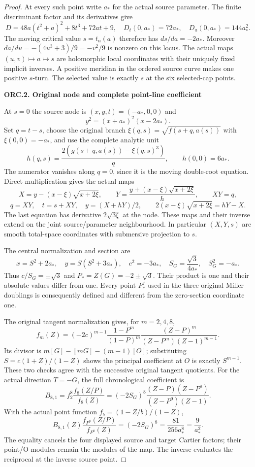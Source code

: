 \begin{proof}
At every such point write \(a_*\) for the actual source parameter.
The finite discriminant factor and its derivatives give
\[
D=48a(t^2+a)^2+8t^3+72at+9,\quad
D_t(0,a_*)=72a_*,\quad D_a(0,a_*)=144a_*^2 .
\tag{ORC.3}
\]
The moving critical value \(s=t_n(a)\) therefore has
\(ds/da=-2a_*\). Moreover \(da/du=-(4u^3+3)/9=-v^2/9\)
is nonzero on this locus. The actual maps
\((u,v)\mapsto a\mapsto s\) are holomorphic local coordinates
with their uniquely fixed implicit inverses. A positive meridian
in the ordered source curve makes one positive \(s\)-turn.
The selected value is exactly \(s\) at the six selected-cap points.

\par

\medskip\noindent\textbf{ORC.2. Original node and complete point-line coefficient}

\par\nobreak

At \(s=0\) the source node is \((x,y,t)=(-a_*,0,0)\) and
\[
y^2=(x+a_*)^2(x-2a_*).
\tag{ORC.4}
\]
Set \(q=t-s\), choose the original branch
\(\xi(q,s)=\sqrt{f(s+q,a(s))}\) with \(\xi(0,0)=-a_*\),
and use the complete analytic unit
\[
h(q,s)=\frac{2(g(s+q,a(s))-\xi(q,s)^3)}q,\qquad h(0,0)=6a_*.
\tag{ORC.5}
\]
The numerator vanishes along \(q=0\), since it is the moving
double-root equation. Direct multiplication gives the actual maps
\[
X=y-(x-\xi)\sqrt{x+2\xi},\qquad
Y=\frac{y+(x-\xi)\sqrt{x+2\xi}}h,\qquad XY=q,
\tag{ORC.6}
\]
\[
q=XY,\quad t=s+XY,\quad y=(X+hY)/2,\qquad
2(x-\xi)\sqrt{x+2\xi}=hY-X.
\tag{ORC.7}
\]
The last equation has derivative \(2\sqrt{3\xi}\) at the node.
These maps and their inverse extend on the joint source/parameter
neighbourhood. In particular \((X,Y,s)\) are smooth total-space
coordinates with submersive projection to \(s\).

The central normalization and section are
\[
x=S^2+2a_*,\quad y=S(S^2+3a_*),\quad
c^2=-3a_*,\quad S_G=\frac{\sqrt3}{4a_*},\quad S_G^2=-a_*.
\tag{ORC.8}
\]
Thus \(c/S_G=\pm\sqrt3\) and
\(P_*=Z(G)=-2\pm\sqrt3\). Their product is one and their
absolute values differ from one. Every point \(P_*^j\) used in
the three original Miller doublings is consequently defined
and different from the zero-section coordinate one.

The original tangent normalization gives, for \(m=2,4,8\),
\[
f_m(Z)=(-2c)^{m-1}\frac{1-P^m}{(1-P)^m}
 \frac{(Z-P)^m}{(Z-P^m)(Z-1)^{m-1}}.
\tag{ORC.9}
\]
Its divisor is \(m[G]-[mG]-(m-1)[O]\); substituting
\(S=c(1+Z)/(1-Z)\) shows the principal coefficient at \(O\)
is exactly \(S^{m-1}\). These two checks agree with the
successive original tangent quotients. For the actual direction
\(T=-G\), the full chronological coefficient is
\[
B_{8,1}=f_2^8\frac{f_8(Z/P)}{f_8(Z)}
 =(-2S_G)^8\frac{(Z-P)(Z-P^8)}{(Z-P^9)(Z-1)}.
\tag{ORC.10}
\]
With the actual point function \(f_b=(1-Z/b)/(1-Z)\),
\[
B_{8,1}(Z)\frac{f_{P^8}(Z/P)}{f_{P^8}(Z)}
=(-2S_G)^8=\frac{81}{256a_*^8}=\frac9{a_*^2}.
\tag{ORC.11}
\]
The equality cancels the four displayed source and target Cartier
factors; their point/O modules remain the modules of the map.
The inverse evaluates the reciprocal at the inverse source point.


\end{proof}
